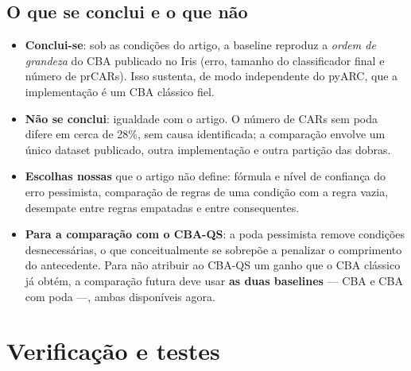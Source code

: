 \documentclass[a4paper,11pt]{article}
\begin{document}
\subsection{O que se conclui e o que não}
\begin{itemize}
  \item \textbf{Conclui-se}: sob as condições do artigo, a baseline reproduz a \emph{ordem de grandeza} do CBA publicado no Iris (erro, tamanho do classificador final e número de prCARs). Isso sustenta, de modo independente do pyARC, que a implementação é um CBA clássico fiel.
  \item \textbf{Não se conclui}: igualdade com o artigo. O número de CARs sem poda difere em cerca de 28\%, sem causa identificada; a comparação envolve um único dataset publicado, outra implementação e outra partição das dobras.
  \item \textbf{Escolhas nossas} que o artigo não define: fórmula e nível de confiança do erro pessimista, comparação de regras de uma condição com a regra vazia, desempate entre regras empatadas e entre consequentes.
  \item \textbf{Para a comparação com o CBA-QS}: a poda pessimista remove condições desnecessárias, o que conceitualmente se sobrepõe a penalizar o comprimento do antecedente. Para não atribuir ao CBA-QS um ganho que o CBA clássico já obtém, a comparação futura deve usar \textbf{as duas baselines} --- CBA e CBA com poda ---, ambas disponíveis agora.
\end{itemize}

\section{Verifica\c{c}\~ao e testes}
\end{document}
